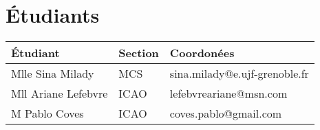 \section{Étudiants}

\begin{tabular}{| l | l | l |}
    \hline
    Étudiant & Section & Coordonées\\
    \hline
    \hline
    Mlle Sina Milady & MCS & sina.milady@e.ujf-grenoble.fr\\
    \hline
    Mll Ariane Lefebvre & ICAO & lefebvreariane@msn.com\\
    \hline
    M Pablo Coves & ICAO & coves.pablo@gmail.com\\
    \hline
\end{tabular}
